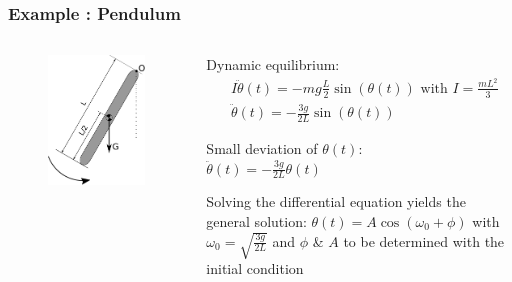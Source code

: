 \begin{frame}
	\frametitle{Example : Pendulum}
	\begin{columns}
		\begin{column}{0.4\linewidth}
			\begin{figure}
				\centering
				\includegraphics[width=1\linewidth]{img/new-pendulum}
				\label{fig:pendulum}
			\end{figure}
		\end{column}
		\begin{column}{0.6\linewidth}
			Dynamic equilibrium:
			\begin{align*}
			&I\ddot{\theta}(t) = -m g \frac{L}{2} \sin(\theta(t)) \text{ with } I= \frac{m L^2}{3} \\
			&\ddot{\theta}(t)  = -\frac{3g}{2L} \sin(\theta(t)) 
			\end{align*}
			
			Small deviation of $\theta(t)$: \\
			\hspace{1cm} $\ddot{\theta}(t) = -\frac{3g}{2L} \theta(t)$
			
			Solving the differential equation yields the general solution:
			$\theta(t) = A\cos(\omega_0 + \phi)$
			with $\omega_0=\sqrt{\frac{3g}{2L}}$ and $\phi$ \& $A$ to be determined with the initial condition
		\end{column}
	\end{columns}
\end{frame}

